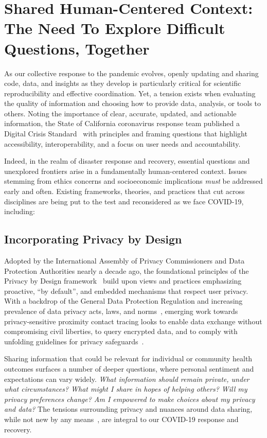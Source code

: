 \section{Shared Human-Centered Context: The Need To Explore Difficult Questions, Together}

As our collective response to the pandemic evolves, openly updating and sharing code, data, and insights as they develop is particularly critical for scientific reproducibility and effective coordination. Yet, a tension exists when evaluating the quality of information and choosing how to provide data, analysis, or tools to others. Noting the importance of clear, accurate, updated, and actionable information, the State of California coronavirus response team published a Digital Crisis Standard~\cite{crisisstandard} with principles and framing questions that highlight accessibility, interoperability, and a focus on user needs and accountability. 

Indeed, in the realm of disaster response and recovery, essential questions and unexplored frontiers arise in a fundamentally human-centered context. Issues stemming from ethics concerns and socioeconomic implications \emph{must} be addressed early and often. Existing frameworks, theories, and practices that cut across disciplines are being put to the test and reconsidered as we face COVID-19, including:

\subsection*{Incorporating Privacy by Design}
Adopted by the International Assembly of Privacy Commissioners and Data Protection Authorities nearly a decade ago, the foundational principles of the Privacy by Design framework~\cite{cavoukian2013privacy} build upon views and practices emphasizing proactive, “by default”, and embedded mechanisms that respect user privacy. With a backdrop of the General Data Protection Regulation and increasing prevalence of data privacy acts, laws, and norms~\cite{GDPR, mares2019iot}, emerging work towards privacy-sensitive proximity contact tracing looks to enable data exchange without compromising civil liberties, to query encrypted data, and to comply with unfolding guidelines for privacy safeguards~\cite{FPF}.

Sharing information that could be relevant for individual or community health outcomes surfaces a number of deeper questions, where personal sentiment and expectations can vary widely. \emph{What information should remain private, under what circumstances? What might I share in hopes of helping others? Will my privacy preferences change? Am I empowered to make choices about my privacy and data?} The tensions surrounding privacy and nuances around data sharing, while not new by any means~\cite{10.1007/3-540-45427-6_23, 10.1145/642611.642635}, are integral to our COVID-19 response and recovery.   

